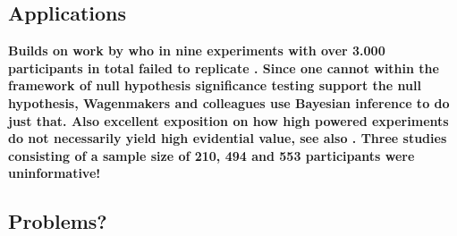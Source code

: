 \documentclass[12pt]{scrartcl}
\begin{document}
\subsection{Applications}
\begin{description}
  \item {}
  
  \item {}
 
  \item {}
  
  \item {}

  \item {}
  
  \textbf{Builds on work by \cite{donnellan2014association} who in nine experiments with over 3.000 participants in total failed to replicate \cite{bargh2012bath}. Since one cannot within the framework of null hypothesis significance testing support the null hypothesis, Wagenmakers and colleagues use Bayesian inference to do just that. Also excellent exposition on how high powered experiments do not necessarily yield high evidential value, see also \cite{wagenmakers2014power}. Three studies consisting of a sample size of 210, 494 and 553 participants were uninformative!}

  \item {}
\end{description}


\subsection{Problems?}
\begin{description}
  \item {}
  
  \item {}
\end{description}
\end{document}
